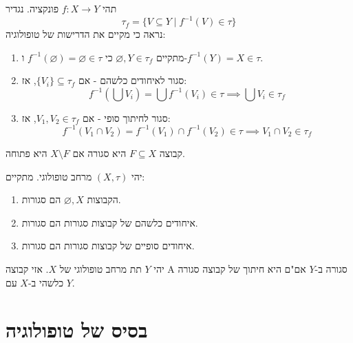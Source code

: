 \documentclass{tstextbook}
\begin{document}
\begin{example}
תהי \(f:X\to Y\) פונקציה. נגדיר
$$ \tau_f = \{ V \subseteq Y \mid f^{-1}(V) \in \tau \} $$
נראה כי מקיים את הדרישות של טופולוגיה:

  \begin{enumerate}
    \item מתקיים \(\varnothing, Y \in \tau_f\) כי \(f^{-1}(\varnothing)=\varnothing \in \tau\) ו-\(f^{-1}(Y)=X \in \tau\). 


    \item סגור לאיחודים כלשהם - אם \(\{V_i\} \subseteq \tau_f\), אז: 
$$f^{-1}(\bigcup V_i) = \bigcup f^{-1}(V_i) \in \tau \implies \bigcup V_i \in \tau_f$$


    \item סגור לחיתוך סופי - אם \(V_1, V_2 \in \tau_f\), אז: 
$$f^{-1}(V_1 \cap V_2) = f^{-1}(V_1) \cap f^{-1}(V_2) \in \tau \implies V_1 \cap V_2 \in \tau_f$$


  \end{enumerate}
\end{example}
\begin{definition}
קבוצה \(F\subseteq X\) היא סגורה אם \(X\setminus F\) היא פתוחה.

\end{definition}
\begin{proposition}
יהי \((X,\tau)\) מרחב טופולוגי. מתקיים:

  \begin{enumerate}
    \item הקבוצות \(\varnothing,X\) הם סגורות. 


    \item איחודים כלשהם של קבוצות סגורות הם סגורות. 


    \item איחודים סופיים של קבוצות סגורות הם סגורות. 


  \end{enumerate}
\end{proposition}
\begin{proposition}
יהי \(Y\) תת מרחב טופולוגי של \(X\). אזי קבוצה A סגורה ב-\(Y\) אם"ם היא חיתוך של קבוצה סגורה כלשהי ב-\(X\) עם \(Y\).

\end{proposition}
\section{בסיס של טופולוגיה}
\end{document}
